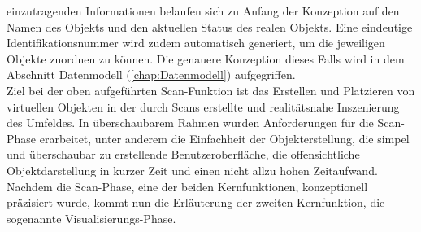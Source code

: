 einzutragenden Informationen belaufen sich zu Anfang der %
Konzeption auf den Namen des Objekts %
und den aktuellen Status des realen Objekts. Eine eindeutige Identifikationsnummer wird zudem automatisch generiert, 
um die jeweiligen Objekte zuordnen zu können. 
Die genauere Konzeption dieses Falls wird in dem Abschnitt Datenmodell (\ref{chap:Datenmodell}) aufgegriffen. 
\\ 
Ziel bei der oben aufgeführten Scan-Funktion ist das Erstellen und Platzieren von virtuellen Objekten in der durch Scans erstellte und 
realitätsnahe Inszenierung des Umfeldes. In überschaubarem Rahmen wurden Anforderungen für die Scan-Phase erarbeitet, unter anderem die 
Einfachheit der Objekterstellung, die simpel und überschaubar zu erstellende Benutzeroberfläche, die offensichtliche Objektdarstellung 
in kurzer Zeit und einen nicht allzu hohen Zeitaufwand.
\\ 
\linebreak
Nachdem die Scan-Phase, eine der beiden Kernfunktionen, konzeptionell präzisiert wurde, kommt nun die Erläuterung der zweiten Kernfunktion, 
die sogenannte Visualisierungs-Phase. 

